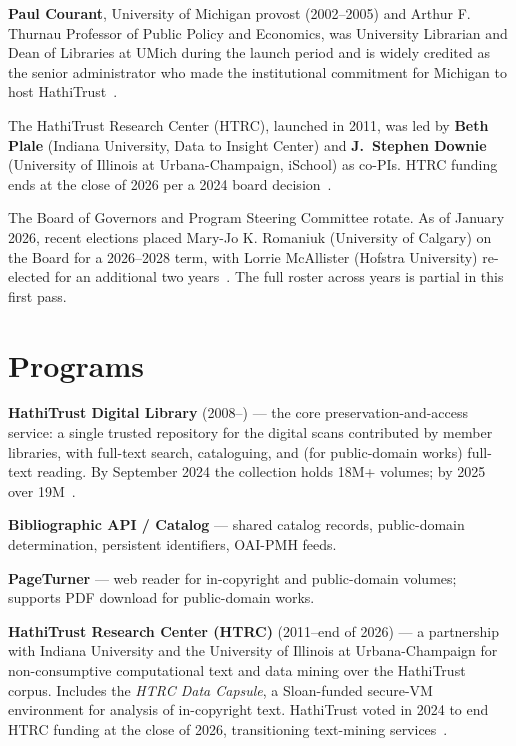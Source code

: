 \documentclass[10pt,letterpaper,twocolumn]{article}
\begin{document}
\textbf{Paul Courant}, University of Michigan provost (2002--2005) and Arthur F. Thurnau Professor of Public Policy and Economics, was University Librarian and Dean of Libraries at UMich during the launch period and is widely credited as the senior administrator who made the institutional commitment for Michigan to host HathiTrust~\citep{courantfordschool}.

The HathiTrust Research Center (HTRC), launched in 2011, was led by \textbf{Beth Plale} (Indiana University, Data to Insight Center) and \textbf{J.~Stephen Downie} (University of Illinois at Urbana-Champaign, iSchool) as co-PIs. HTRC funding ends at the close of 2026 per a 2024 board decision~\citep{htrctransition}.

The Board of Governors and Program Steering Committee rotate. As of January 2026, recent elections placed Mary-Jo K. Romaniuk (University of Calgary) on the Board for a 2026--2028 term, with Lorrie McAllister (Hofstra University) re-elected for an additional two years~\citep{hathi2026budget}. The full roster across years is partial in this first pass.

\section{Programs}

\textbf{HathiTrust Digital Library} (2008--) --- the core preservation-and-access service: a single trusted repository for the digital scans contributed by member libraries, with full-text search, cataloguing, and (for public-domain works) full-text reading. By September 2024 the collection holds 18M+ volumes; by 2025 over 19M~\citep{wikipediahathi}.

\textbf{Bibliographic API / Catalog} --- shared catalog records, public-domain determination, persistent identifiers, OAI-PMH feeds.

\textbf{Page\-Turner} --- web reader for in-copyright and public-domain volumes; supports PDF download for public-domain works.

\textbf{HathiTrust Research Center (HTRC)} (2011--end of 2026) --- a partnership with Indiana University and the University of Illinois at Urbana-Champaign for non-consumptive computational text and data mining over the HathiTrust corpus. Includes the \emph{HTRC Data Capsule}, a Sloan-funded secure-VM environment for analysis of in-copyright text. HathiTrust voted in 2024 to end HTRC funding at the close of 2026, transitioning text-mining services~\citep{htrctransition,iuhtrc2011}.
\end{document}

